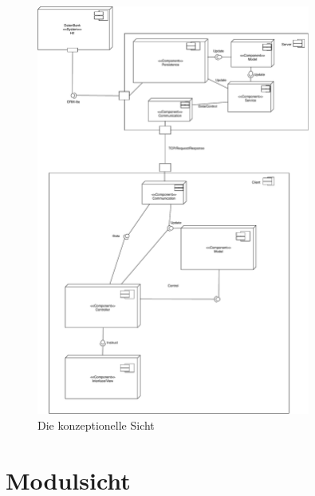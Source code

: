 \documentclass[fontsize=12pt,paper=a4,twoside]{scrartcl}
\begin{document}
\begin{figure}[H]
\begin{center}
  \includegraphics[width=340px]{UML/KonzeptionelleSicht.pdf}
  \caption{Die konzeptionelle Sicht}
  \label{fig:boat1}
\end{center}
\end{figure}


\section{Modulsicht} \label{sec:modulsicht}


\end{document}
